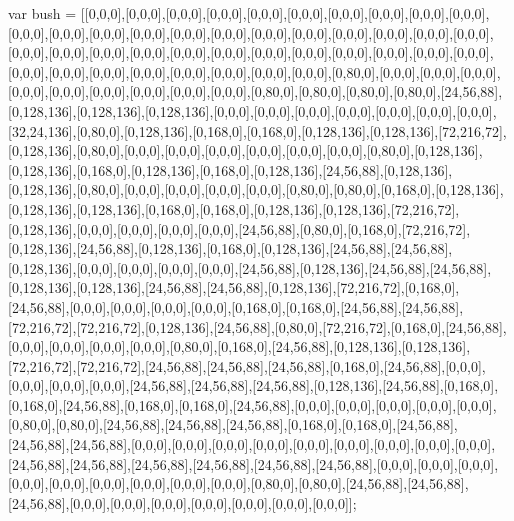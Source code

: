 var bush = [[0,0,0],[0,0,0],[0,0,0],[0,0,0],[0,0,0],[0,0,0],[0,0,0],[0,0,0],[0,0,0],[0,0,0],[0,0,0],[0,0,0],[0,0,0],[0,0,0],[0,0,0],[0,0,0],[0,0,0],[0,0,0],[0,0,0],[0,0,0],[0,0,0],[0,0,0],[0,0,0],[0,0,0],[0,0,0],[0,0,0],[0,0,0],[0,0,0],[0,0,0],[0,0,0],[0,0,0],[0,0,0],[0,0,0],[0,0,0],[0,0,0],[0,0,0],[0,0,0],[0,0,0],[0,0,0],[0,0,0],[0,0,0],[0,0,0],[0,80,0],[0,0,0],[0,0,0],[0,0,0],[0,0,0],[0,0,0],[0,0,0],[0,0,0],[0,0,0],[0,0,0],[0,80,0],[0,80,0],[0,80,0],[0,80,0],[24,56,88],[0,128,136],[0,128,136],[0,128,136],[0,0,0],[0,0,0],[0,0,0],[0,0,0],[0,0,0],[0,0,0],[0,0,0],[32,24,136],[0,80,0],[0,128,136],[0,168,0],[0,168,0],[0,128,136],[0,128,136],[72,216,72],[0,128,136],[0,80,0],[0,0,0],[0,0,0],[0,0,0],[0,0,0],[0,0,0],[0,0,0],[0,80,0],[0,128,136],[0,128,136],[0,168,0],[0,128,136],[0,168,0],[0,128,136],[24,56,88],[0,128,136],[0,128,136],[0,80,0],[0,0,0],[0,0,0],[0,0,0],[0,0,0],[0,80,0],[0,80,0],[0,168,0],[0,128,136],[0,128,136],[0,128,136],[0,168,0],[0,168,0],[0,128,136],[0,128,136],[72,216,72],[0,128,136],[0,0,0],[0,0,0],[0,0,0],[0,0,0],[24,56,88],[0,80,0],[0,168,0],[72,216,72],[0,128,136],[24,56,88],[0,128,136],[0,168,0],[0,128,136],[24,56,88],[24,56,88],[0,128,136],[0,0,0],[0,0,0],[0,0,0],[0,0,0],[24,56,88],[0,128,136],[24,56,88],[24,56,88],[0,128,136],[0,128,136],[24,56,88],[24,56,88],[0,128,136],[72,216,72],[0,168,0],[24,56,88],[0,0,0],[0,0,0],[0,0,0],[0,0,0],[0,168,0],[0,168,0],[24,56,88],[24,56,88],[72,216,72],[72,216,72],[0,128,136],[24,56,88],[0,80,0],[72,216,72],[0,168,0],[24,56,88],[0,0,0],[0,0,0],[0,0,0],[0,0,0],[0,80,0],[0,168,0],[24,56,88],[0,128,136],[0,128,136],[72,216,72],[72,216,72],[24,56,88],[24,56,88],[24,56,88],[0,168,0],[24,56,88],[0,0,0],[0,0,0],[0,0,0],[0,0,0],[24,56,88],[24,56,88],[24,56,88],[0,128,136],[24,56,88],[0,168,0],[0,168,0],[24,56,88],[0,168,0],[0,168,0],[24,56,88],[0,0,0],[0,0,0],[0,0,0],[0,0,0],[0,0,0],[0,80,0],[0,80,0],[24,56,88],[24,56,88],[24,56,88],[0,168,0],[0,168,0],[24,56,88],[24,56,88],[24,56,88],[0,0,0],[0,0,0],[0,0,0],[0,0,0],[0,0,0],[0,0,0],[0,0,0],[0,0,0],[0,0,0],[24,56,88],[24,56,88],[24,56,88],[24,56,88],[24,56,88],[24,56,88],[0,0,0],[0,0,0],[0,0,0],[0,0,0],[0,0,0],[0,0,0],[0,0,0],[0,0,0],[0,0,0],[0,80,0],[0,80,0],[24,56,88],[24,56,88],[24,56,88],[0,0,0],[0,0,0],[0,0,0],[0,0,0],[0,0,0],[0,0,0],[0,0,0]];

